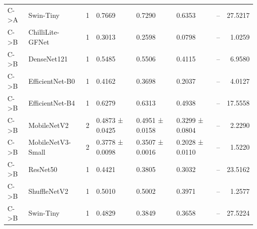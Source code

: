 \begin{tabular}{llrllllr}
C->A & Swin-Tiny & 1 & 0.7669 & 0.7290 & 0.6353 & -- & 27.5217 \\
C->B & ChilliLite-GFNet & 1 & 0.3013 & 0.2598 & 0.0798 & -- & 1.0259 \\
C->B & DenseNet121 & 1 & 0.5485 & 0.5506 & 0.4115 & -- & 6.9580 \\
C->B & EfficientNet-B0 & 1 & 0.4162 & 0.3698 & 0.2037 & -- & 4.0127 \\
C->B & EfficientNet-B4 & 1 & 0.6279 & 0.6313 & 0.4938 & -- & 17.5558 \\
C->B & MobileNetV2 & 2 & 0.4873 ± 0.0425 & 0.4951 ± 0.0158 & 0.3299 ± 0.0804 & -- & 2.2290 \\
C->B & MobileNetV3-Small & 2 & 0.3778 ± 0.0098 & 0.3507 ± 0.0016 & 0.2028 ± 0.0110 & -- & 1.5220 \\
C->B & ResNet50 & 1 & 0.4421 & 0.3805 & 0.3032 & -- & 23.5162 \\
C->B & ShuffleNetV2 & 1 & 0.5010 & 0.5002 & 0.3971 & -- & 1.2577 \\
C->B & Swin-Tiny & 1 & 0.4829 & 0.3849 & 0.3658 & -- & 27.5224 \\
\bottomrule
\end{tabular}
